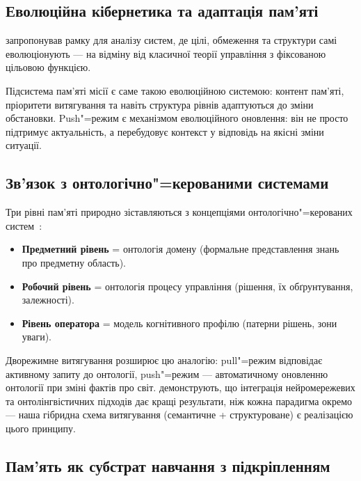 \documentclass[11pt]{article}
\begin{document}
\subsection{Еволюційна кібернетика та адаптація пам'яті}

\citet{palagin2025evolutionary} запропонував рамку для аналізу систем, де цілі, обмеження та структури самі еволюціонують --- на відміну від класичної теорії управління з фіксованою цільовою функцією.

Підсистема пам'яті місії є саме такою еволюційною системою: контент пам'яті, пріоритети витягування та навіть структура рівнів адаптуються до зміни обстановки.
Push"=режим є механізмом еволюційного оновлення: він не просто підтримує актуальність, а перебудовує контекст у відповідь на якісні зміни ситуації.

\subsection{Зв'язок з онтологічно"=керованими системами}

Три рівні пам'яті природно зіставляються з концепціями онтологічно"=керованих систем~\citep{palagin2006architecture}:

\begin{itemize}[nosep]
  \item \textbf{Предметний рівень} = онтологія домену (формальне представлення знань про предметну область).
  \item \textbf{Робочий рівень} = онтологія процесу управління (рішення, їх обґрунтування, залежності).
  \item \textbf{Рівень оператора} = модель когнітивного профілю (патерни рішень, зони уваги).
\end{itemize}

Дворежимне витягування розширює цю аналогію: pull"=режим відповідає активному запиту до онтології, push"=режим --- автоматичному оновленню онтології при зміні фактів про світ.
\citet{palagin2024neural} демонструють, що інтеграція нейромережевих та онтолінгвістичних підходів дає кращі результати, ніж кожна парадигма окремо --- наша гібридна схема витягування (семантичне + структуроване) є реалізацією цього принципу.

\subsection{Пам'ять як субстрат навчання з підкріпленням}
\label{sec:disc-rlhf-substrate}
\end{document}
